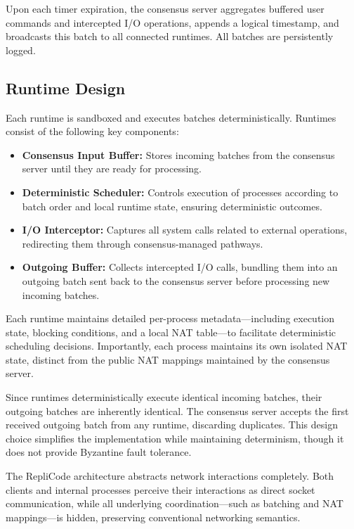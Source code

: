 \documentclass[10pt, 
]{IEEEtran}
\begin{document}
Upon each timer expiration, the consensus server aggregates buffered user commands and intercepted I/O operations, appends a logical timestamp, and broadcasts this batch to all connected runtimes. All batches are persistently logged.

\subsection{Runtime Design}

Each runtime is sandboxed and executes batches deterministically. Runtimes consist of the following key components:

\begin{itemize}
\item \textbf{Consensus Input Buffer:} Stores incoming batches from the consensus server until they are ready for processing.
\item \textbf{Deterministic Scheduler:} Controls execution of processes according to batch order and local runtime state, ensuring deterministic outcomes.
\item \textbf{I/O Interceptor:} Captures all system calls related to external operations, redirecting them through consensus-managed pathways.
\item \textbf{Outgoing Buffer:} Collects intercepted I/O calls, bundling them into an outgoing batch sent back to the consensus server before processing new incoming batches.
\end{itemize}

Each runtime maintains detailed per-process metadata—including execution state, blocking conditions, and a local NAT table—to facilitate deterministic scheduling decisions. Importantly, each process maintains its own isolated NAT state, distinct from the public NAT mappings maintained by the consensus server. 

Since runtimes deterministically execute identical incoming batches, their outgoing batches are inherently identical. The consensus server accepts the first received outgoing batch from any runtime, discarding duplicates. This design choice simplifies the implementation while maintaining determinism, though it does not provide Byzantine fault tolerance.

The RepliCode architecture abstracts network interactions completely. Both clients and internal processes perceive their interactions as direct socket communication, while all underlying coordination—such as batching and NAT mappings—is hidden, preserving conventional networking semantics.
\end{document}
